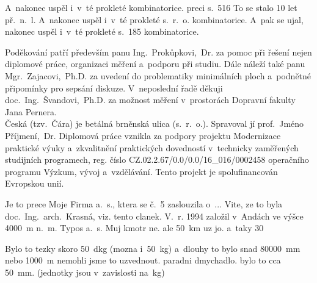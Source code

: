 
A~nakonec uspěl i~v~té prokleté kombinatorice.
preci s.~516
To se stalo 10 let př.~n.~l.
A~nakonec uspěl i~v~té prokleté s.~r.~o. kombinatorice. A~pak se ujal, nakonec uspěl i~v~té prokleté s.~185 kombinatorice.

\noindent Poděkování patří především panu Ing.~Prokůpkovi,~Dr. za pomoc při řešení nejen diplomové práce, organizaci měření a~podporu při studiu. Dále náleží také panu Mgr.~Zajacovi,~Ph.D. za uvedení do problematiky minimálních ploch a~podnětné připomínky pro sepsání diskuze. V~neposlední řadě děkuji doc.~Ing.~Švandovi,~Ph.D. za možnost měření v~prostorách Dopravní fakulty Jana Pernera.\\
Česká (tzv.~Čára) je betálná brněnská ulica (s.~r.~o.). Spravoval jí prof.~Jméno Příjmení,~Dr.
\noindent Diplomová práce vznikla za podpory projektu Modernizace praktické výuky a~zkvalitnění praktických dovedností v~technicky zaměřených studijních programech, reg. číslo CZ.02.2.67/0.0/0.0/16\_016/0002458 operačního programu Výzkum, vývoj a~vzdělávání. Tento projekt je spolufinancován Evropskou unií.

Je to prece Moje Firma a.~s., ktera se č.~5 zaslouzila o~... Vite, ze to byla doc.~Ing.~arch.~Krasná, viz. tento clanek.
V.~r. 1994 založil v~Andách ve výšce 4000~m n.~m. Typos a.~s.
Muj kmotr ne. ale 50~km uz jo. a~taky 30~%


Bylo to tezky skoro 50~dkg (mozna i~50~kg) a~dlouhy to bylo snad 80000~mm nebo 1000~m nemohli jsme to uzvednout.
paradni dmychadlo. bylo to cca 50~mm. (jednotky jsou v~zavislosti na~kg)
